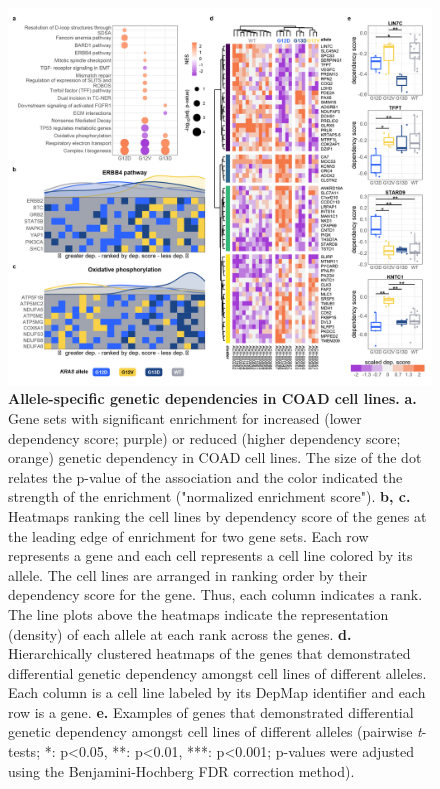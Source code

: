 \begin{figure}[htbp]
\centering
\includegraphics[width=180mm]{figures/aim1/Fig_4_mod.jpg}
\caption{
\textbf{Allele-specific genetic dependencies in COAD cell lines.}
\textbf{a.} Gene sets with significant enrichment for increased (lower dependency score; purple) or reduced (higher dependency score; orange) genetic dependency in COAD cell lines. The size of the dot relates the p-value of the association and the color indicated the strength of the enrichment ("normalized enrichment score").
\textbf{b, c.} Heatmaps ranking the cell lines by dependency score of the genes at the leading edge of enrichment for two gene sets. Each row represents a gene and each cell represents a cell line colored by its \KRAS{} allele. The cell lines are arranged in ranking order by their dependency score for the gene. Thus, each column indicates a rank. The line plots above the heatmaps indicate the representation (density) of each \KRAS{} allele at each rank across the genes.
\textbf{d.} Hierarchically clustered heatmaps of the genes that demonstrated differential genetic dependency amongst cell lines of different \KRAS{} alleles. Each column is a cell line labeled by its DepMap identifier and each row is a gene.
\textbf{e.} Examples of genes that demonstrated differential genetic dependency amongst cell lines of different \KRAS{} alleles (pairwise \emph{t}-tests; *: p<0.05, **: p<0.01, ***: p<0.001; p-values were adjusted using the Benjamini-Hochberg FDR correction method).
}
\label{fig:genetic-dependency}
\end{figure}
